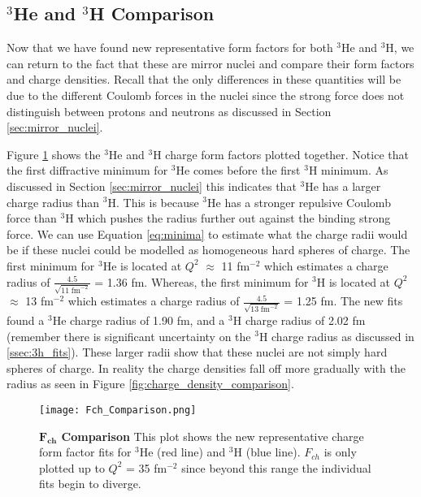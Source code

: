\subsection{$^3$He and $^3$H Comparison}
\label{ssec:comparison}

Now that we have found new representative form factors for both $^3$He and $^3$H, we can return to the fact that these are mirror nuclei and compare their form factors and charge densities. Recall that the only differences in these quantities will be due to the different Coulomb forces in the nuclei since the strong force does not distinguish between protons and neutrons as discussed in Section \ref{sec:mirror_nuclei}. 

Figure \ref{fig:fch_comparison} shows the $^3$He and $^3$H charge form factors plotted together. Notice that the first diffractive minimum for $^3$He comes before the first $^3$H minimum. As discussed in Section \ref{sec:mirror_nuclei} this indicates that $^3$He has a larger charge radius than $^3$H. This is because $^3$He has a stronger repulsive Coulomb force than $^3$H which pushes the radius further out against the binding strong force. We can use Equation \ref{eq:minima} to estimate what the charge radii would be if these nuclei could be modelled as homogeneous hard spheres of charge. The first minimum for $^3$He is located at $Q^2$ $\approx$ 11 fm$^{-2}$ which estimates a charge radius of $\frac{4.5}{\sqrt{11 \; \text{fm}^{-2}}}$ = 1.36 fm. Whereas, the first minimum for $^3$H is located at $Q^2$ $\approx$ 13 fm$^{-2}$ which estimates a charge radius of $\frac{4.5}{\sqrt{13 \; \text{fm}^{-2}}}$ = 1.25 fm. The new fits found a $^3$He charge radius of 1.90 fm, and a $^3$H charge radius of 2.02 fm (remember there is significant uncertainty on the $^3$H charge radius as discussed in \ref{ssec:3h_fits}). These larger radii show that these nuclei are not simply hard spheres of charge. In reality the charge densities fall off more gradually with the radius as seen in Figure \ref{fig:charge_density_comparison}. 

\begin{figure}[!ht]
	\begin{center}
	\texttt{[image: Fch\_Comparison.png]}
	\end{center}
	\caption[$F_{ch}$ Comparison]{
	{\bf{$\boldsymbol{F_{ch}}$ Comparison}} This plot shows the new representative charge form factor fits for $^3$He (red line) and $^3$H (blue line). $F_{ch}$ is only plotted up to $Q^2$ = 35 fm$^{-2}$ since beyond this range the individual fits begin to diverge.}
	\label{fig:fch_comparison}
\end{figure}

